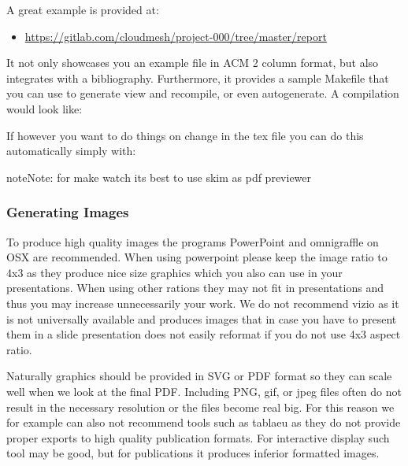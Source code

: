 A great example is provided at:
\begin{itemize}
\item {} 
\url{https://gitlab.com/cloudmesh/project-000/tree/master/report}

\end{itemize}

It not only showcases you an example file in ACM 2 column format, but
also integrates with a bibliography. Furthermore, it provides a
sample Makefile that you can use to generate view and recompile, or
even autogenerate. A compilation would look like:

\begin{sphinxVerbatim}[commandchars=\\\{\}]
 
\end{sphinxVerbatim}

If however you want to do things on change in the tex file you can do
this automatically simply with:

\begin{sphinxVerbatim}[commandchars=\\\{\}]
 
\end{sphinxVerbatim}

\begin{sphinxadmonition}{note}{Note:}
for make watch its best to use skim as pdf previewer
\end{sphinxadmonition}


\subsubsection{Generating Images}
\label{\detokenize{lesson/doc/latex:generating-images}}
To produce high quality images the programs PowerPoint and omnigraffle
on OSX are recommended. When using powerpoint please keep the image
ratio to 4x3 as they produce nice size graphics which you also can use in
your presentations. When using other rations they may not fit in
presentations and thus you may increase unnecessarily your work. We do
not recommend vizio as it is not universally available and produces
images that in case you have to present them in a slide presentation
does not easily reformat if you do not use 4x3 aspect ratio.

Naturally graphics should be provided in SVG or PDF format so they can
scale well when we look at the final PDF. Including PNG, gif, or jpeg
files often do not result in the necessary resolution or the files
become real big. For this reason we for example can also not recommend
tools such as tablaeu as they do not provide proper exports to high
quality publication formats. For interactive display such tool may be
good, but for publications it produces inferior formatted images.


